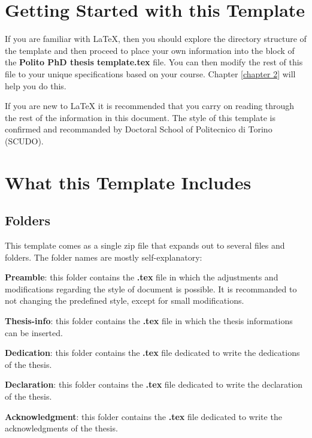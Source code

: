 \section{Getting Started with this Template}  %
\label{section1.2}
If you are familiar with \LaTeX{}, then you should explore the directory structure of the template and then proceed to place your own information into the  block of the \textbf{Polito PhD thesis template.tex} file. You can then modify the rest of this file to your unique specifications based on your course. Chapter \ref{chapter 2} will help you do this.

If you are new to \LaTeX{} it is recommended that you carry on reading through the rest of the information in this document. The style of this template is confirmed and recommanded by Doctoral School of Politecnico di Torino (SCUDO).

\section{What this Template Includes}
\label{section 1.3}

\subsection{Folders}

This template comes as a single zip file that expands out to several files and folders. The folder names are mostly self-explanatory:

\textbf{Preamble}: this folder contains the \textbf{.tex} file in which the adjustments and modifications regarding the style of document is possible. It is recommanded to not changing the predefined style, except for small modifications.

\textbf{Thesis-info}: this folder contains the \textbf{.tex} file in which the thesis informations can be inserted.
 
\textbf{Dedication}: this folder contains the \textbf{.tex} file dedicated to write the dedications of the thesis.

\textbf{Declaration}: this folder contains the \textbf{.tex} file dedicated to write the declaration of the thesis.

\textbf{Acknowledgment}: this folder contains the \textbf{.tex} file dedicated to write the acknowledgments of the thesis. 

